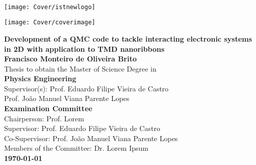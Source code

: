 \setcounter{page}{1} 


\thispagestyle{empty}

\begin{flushleft} ~\\ \vspace{-12mm} \hspace{-12mm}
\texttt{[image: Cover/istnewlogo]}
\vspace{10mm}
\\ \begin{center} \texttt{[image: Cover/coverimage]} \end{center} %
 \vspace{5mm}
\centering
\LARGE \textbf{Development of a QMC code to tackle interacting electronic systems in 2D with application to TMD nanoribbons}
\\
\vspace{15mm}
\Large \textbf{Francisco Monteiro de Oliveira Brito} \\
\vspace{12mm}
\large Thesis to obtain the Master of Science Degree in
\\ \vspace{2mm}
\LARGE \textbf{Physics Engineering}
\\ \vspace{10mm}
\large Supervisor(s): Prof. Eduardo Filipe Vieira de Castro  \\
\large Prof. João Manuel Viana Parente Lopes 
\\ \vspace{10mm}
\Large \textbf{Examination Committee}
\\ \vspace{5mm}
\large Chairperson: Prof. Lorem \\
\large Supervisor: Prof. Eduardo Filipe Vieira de Castro \\
\large Co-Supervisor: Prof. João Manuel Viana Parente Lopes  \\
\large Members of the Committee: Dr. Lorem Ipsum \\
\vspace{5mm}
\Large \textbf{\todaythesis\today} \\
\let\thepage\relax
\end{flushleft}
\pagebreak


\clearpage

\thispagestyle{empty}
\cleardoublepage

\setcounter{page}{1} 

\baselineskip 18pt %
